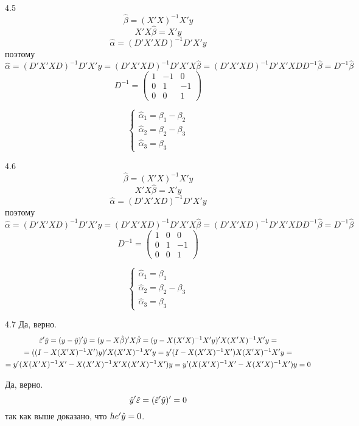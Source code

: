 \protect \hypertarget {soln:4.5}{}
\begin{solution}{{4.5}}
\[\hat\beta=(X'X)^{-1}X'y\]
\[X'X\hat\beta=X'y\]
\[\hat\alpha=(D'X'XD)^{-1}D'X'y\]
поэтому
\[\hat\alpha=(D'X'XD)^{-1}D'X'y=(D'X'XD)^{-1}D'X'X\hat\beta=(D'X'XD)^{-1}D'X'XDD^{-1}\hat\beta=D^{-1}\hat\beta\]
\[D^{-1}=\left(\begin{array}{ccc}
1 & -1 & 0\\
0 & 1 & -1\\
0 & 0 & 1
\end{array}\right)\]

\[\begin{cases}
\hat\alpha_1=\beta_1-\beta_2\\
\hat\alpha_2=\beta_2-\beta_3\\
\hat\alpha_3=\beta_3
\end{cases}\]
\end{solution}
\protect \hypertarget {soln:4.6}{}
\begin{solution}{{4.6}}
\[\hat\beta=(X'X)^{-1}X'y\]
\[X'X\hat\beta=X'y\]
\[\hat\alpha=(D'X'XD)^{-1}D'X'y\]
поэтому
\[\hat\alpha=(D'X'XD)^{-1}D'X'y=(D'X'XD)^{-1}D'X'X\hat\beta=(D'X'XD)^{-1}D'X'XDD^{-1}\hat\beta=D^{-1}\hat\beta\]
\[D^{-1}=\left(\begin{array}{ccc}
1 & 0 & 0\\
0 & 1 & -1\\
0 & 0 & 1
\end{array}\right)\]

\[\begin{cases}
\hat\alpha_1=\beta_1\\
\hat\alpha_2=\beta_2-\beta_3\\
\hat\alpha_3=\beta_3
\end{cases}\]
\end{solution}
\protect \hypertarget {soln:4.7}{}
\begin{solution}{{4.7}}
Да, верно.
\begin{multline*}
\hat{\varepsilon}'\hat{y}=(y-\hat{y})'\hat{y}=(y-X\hat\beta)'X\hat\beta=(y-X(X'X)^{-1}X'y)'X(X'X)^{-1}X'y=\\=
((I-X(X'X)^{-1}X')y)'X(X'X)^{-1}X'y=y'(I-X(X'X)^{-1}X')X(X'X)^{-1}X'y=\\
=y'(X(X'X)^{-1}X'-X(X'X)^{-1}X'X(X'X)^{-1}X')y=y'(X(X'X)^{-1}X'-X(X'X)^{-1}X')y=0
\end{multline*}

Да, верно.
\[\hat{y}'\hat{\varepsilon}=(\hat{\varepsilon}'\hat{y})'=0\]
так как выше доказано, что $he'\hat{y}=0$.
\end{solution}
\protect \hypertarget {soln:4.8}{}
